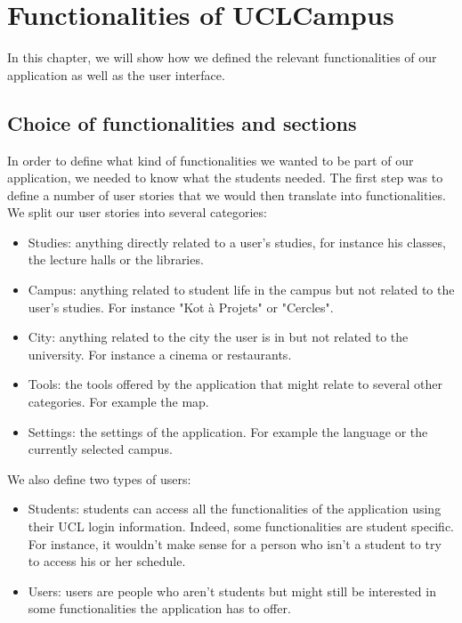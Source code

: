 \documentclass[11pt, a4paper]{report}
\begin{document}
\chapter{Functionalities of UCLCampus}

In this chapter, we will show how we defined the relevant functionalities of our application as well as the user interface.

\section{Choice of functionalities and sections}


In order to define what kind of functionalities we wanted to be part of our application, we needed to know what the students needed. The first step was to define a number of user stories that we would then translate into functionalities.\\ 
We split our user stories into several categories:

\begin{itemize}

\item Studies: anything directly related to a user's studies, for instance his classes, the lecture halls or the libraries.
\item Campus: anything related to student life in the campus but not related to the user's studies. For instance "Kot à Projets" or "Cercles".
\item City: anything related to the city the user is in but not related to the university. For instance a cinema or restaurants.
\item Tools: the tools offered by the application that might relate to several other categories. For example the map.
\item Settings: the settings of the application. For example the language or the currently selected campus.

\end{itemize}

We also define two types of users:

\begin{itemize}

\item Students: students can access all the functionalities of the application using their UCL login information. Indeed, some functionalities are student specific. For instance, it wouldn't make sense for a person who isn't a student to try to access his or her schedule.

\item Users: users are people who aren't students but might still be interested in some functionalities the application has to offer. 

\end{itemize}
\end{document}
